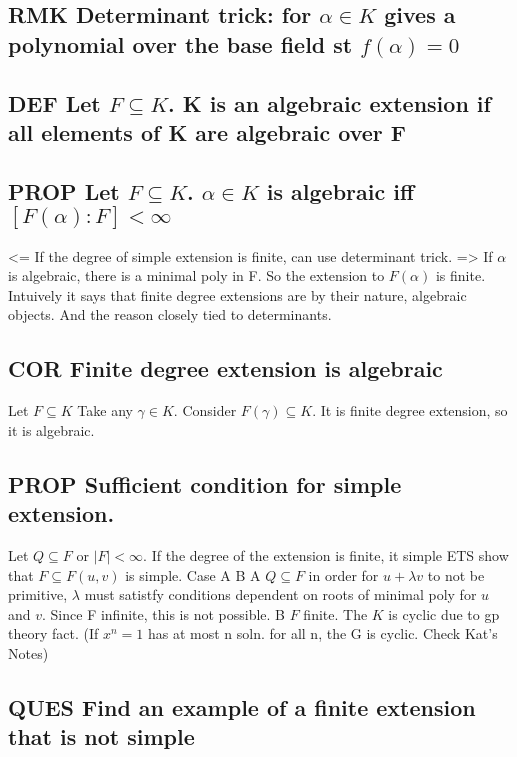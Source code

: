\documentclass[11pt]{article}
\begin{document}
\subsection{\textbf{RMK} Determinant trick: for \(\alpha \in K\) gives a polynomial over the base field st \(f(\alpha)=0\)}
\label{sec:orgb74d53c}
\subsection{\textbf{DEF} Let \(F \subseteq K\). K is an \textbf{algebraic extension} if all elements of K are algebraic over F}
\label{sec:org8764f90}
\subsection{\textbf{PROP} Let \(F \subseteq K\). \(\alpha \in K\) is algebraic iff \([F(\alpha):F] < \infty\)}
\label{sec:org5bc486f}
<= If the degree of simple extension is finite, can use determinant trick.
=> If \(\alpha\) is algebraic, there is a minimal poly in F. So the extension to \(F(\alpha)\) is finite.
Intuively it says that finite degree extensions are by their nature, algebraic objects. And the reason closely tied to determinants.
\subsection{\textbf{COR} Finite degree extension is algebraic}
\label{sec:org30c6c3c}
Let \(F \subseteq K\) Take any \(\gamma \in K\). Consider \(F(\gamma) \subseteq K\). It is finite degree extension, so it is algebraic. 
\subsection{\textbf{PROP} Sufficient condition for simple extension.}
\label{sec:org5a3fde3}
Let \(Q \subseteq F\) or \(|F| < \infty\). If the degree of the extension is finite, it simple
ETS show that \(F \subseteq F(u,v)\) is simple.
Case A B
A \(Q \subseteq F\) in order for \(u+\lambda v\) to not be primitive, \(\lambda\) must satistfy conditions dependent on roots of minimal poly for \(u\) and \(v\). Since F infinite, this is not possible.
B \(F\) finite. The \(K\) is cyclic due to gp theory fact. (If \(x^n=1\) has at most n soln. for all n, the G is cyclic. Check Kat's Notes)
\subsection{\textbf{QUES} Find an example of a finite extension that is not simple}
\label{sec:orgc2a51bb}
\end{document}
